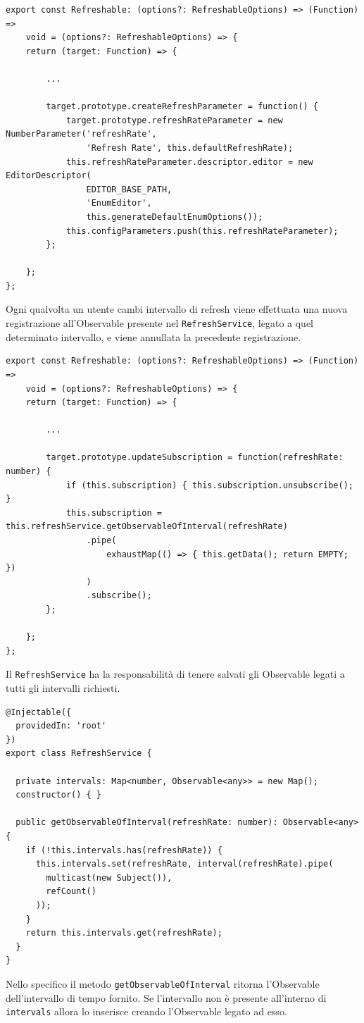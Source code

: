\begin{lstlisting}[caption={Creazione del refreshRateParameter all'interno del Refreshable decorator}, style=javaScriptCode]
export const Refreshable: (options?: RefreshableOptions) => (Function) => 
    void = (options?: RefreshableOptions) => {
    return (target: Function) => {
        
        ...
        
        target.prototype.createRefreshParameter = function() {
            target.prototype.refreshRateParameter = new NumberParameter('refreshRate', 
                'Refresh Rate', this.defaultRefreshRate);
            this.refreshRateParameter.descriptor.editor = new EditorDescriptor(
                EDITOR_BASE_PATH,
                'EnumEditor',
                this.generateDefaultEnumOptions());
            this.configParameters.push(this.refreshRateParameter);
        };
        
    };
};
\end{lstlisting}
Ogni qualvolta un utente cambi intervallo di refresh viene effettuata una nuova registrazione all'Observable presente nel \verb|RefreshService|, legato a quel determinato intervallo, e viene annullata la precedente registrazione.

\begin{lstlisting}[caption={Metodo updateSubscription all'interno del Refreshable decorator}, style=javaScriptCode]
export const Refreshable: (options?: RefreshableOptions) => (Function) => 
    void = (options?: RefreshableOptions) => {
    return (target: Function) => {
        
        ...

        target.prototype.updateSubscription = function(refreshRate: number) {
            if (this.subscription) { this.subscription.unsubscribe(); }
            this.subscription = this.refreshService.getObservableOfInterval(refreshRate)
                .pipe(
                    exhaustMap(() => { this.getData(); return EMPTY; })
                )
                .subscribe();
        };
        
    };
};
\end{lstlisting}
Il \verb|RefreshService| ha la responsabilità di tenere salvati gli Observable legati a tutti gli intervalli richiesti.

\begin{lstlisting}[caption={Classe RefreshService}, style=javaScriptCode]
@Injectable({
  providedIn: 'root'
})
export class RefreshService {

  private intervals: Map<number, Observable<any>> = new Map();
  constructor() { }

  public getObservableOfInterval(refreshRate: number): Observable<any> {
    if (!this.intervals.has(refreshRate)) {
      this.intervals.set(refreshRate, interval(refreshRate).pipe(
        multicast(new Subject()),
        refCount()
      ));
    }
    return this.intervals.get(refreshRate);
  }
}
\end{lstlisting}
Nello specifico il metodo \verb|getObservableOfInterval| ritorna l'Observable dell'intervallo di tempo fornito. Se l'intervallo non è presente all'interno di \verb|intervals| allora lo inserisce creando l'Observable legato ad esso.

